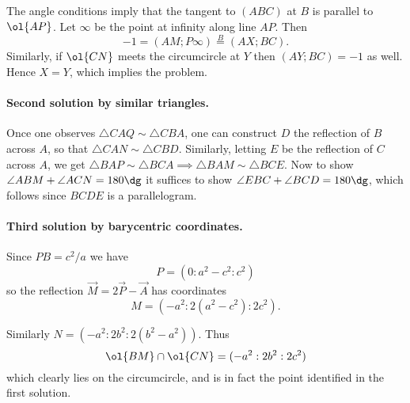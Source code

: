 The angle conditions imply that the tangent to $(ABC)$ at $B$
is parallel to $\ol{AP}$.
Let $\infty$ be the point at infinity along line $AP$.
Then \[ -1 = (AM;P\infty) \overset{B}{=} (AX;BC). \]
Similarly, if $\ol{CN}$ meets the circumcircle at $Y$
then $(AY;BC) = -1$ as well.
Hence $X=Y$, which implies the problem.

\paragraph{Second solution by similar triangles.}
Once one observes $\triangle CAQ \sim \triangle CBA$,
one can construct $D$ the reflection of $B$ across $A$,
so that $\triangle CAN \sim \triangle CBD$.
Similarly, letting $E$ be the reflection of $C$ across $A$,
we get $\triangle BAP \sim \triangle BCA
\implies \triangle BAM \sim \triangle BCE$.
Now to show $\angle ABM + \angle ACN = 180\dg$
it suffices to show $\angle EBC + \angle BCD = 180\dg$,
which follows since $BCDE$ is a parallelogram.

\paragraph{Third solution by barycentric coordinates.}
Since $PB = c^2/a$ we have
\[ P = (0 : a^2-c^2 : c^2) \]
so the reflection $\vec M = 2\vec P - \vec A$ has coordinates
\[ M = (-a^2 : 2(a^2-c^2) : 2c^2). \]

Similarly $N = (-a^2 : 2b^2 : 2(b^2-a^2))$. Thus
\[ \ol{BM} \cap \ol{CN} = (-a^2 : 2b^2 : 2c^2) \]
which clearly lies on the circumcircle,
and is in fact the point identified in the first solution.
\pagebreak